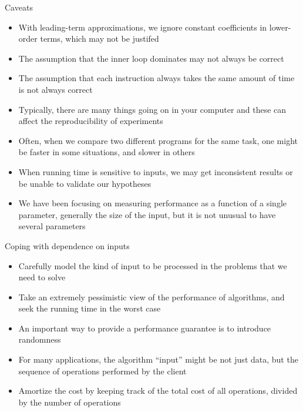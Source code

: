 \documentclass[8pt,a4paper,compress]{beamer}
\begin{document}
\begin{frame}[fragile]
\pause

Caveats
\begin{itemize}
\item With leading-term approximations, we ignore constant coefficients in lower-order terms, which may not be justifed

\item The assumption that the inner loop dominates may not always be correct 

\item The assumption that each instruction always takes the same amount of time is not always correct

\item Typically, there are many things going on in your computer and these can affect the reproducibility of experiments

\item Often, when we compare two different programs for the same task, one might be faster in some situations, and slower in others

\item When running time is sensitive to inputs, we may get inconsistent results or be unable to validate our hypotheses

\item We have been focusing on measuring performance as a function of a single parameter, generally the size of the input, but it is not unusual to have several parameters
\end{itemize}
\end{frame}

\begin{frame}[fragile]
\pause

Coping with dependence on inputs
\begin{itemize}
\item Carefully model the kind of input to be processed in the problems that we need to solve

\item Take an extremely pessimistic view of the performance of algorithms, and seek the running time in the worst case

\item An important way to provide a performance guarantee is to introduce randomness

\item For many applications, the algorithm ``input'' might be not just data, but the sequence of operations performed by the client

\item Amortize the cost by keeping track of the total cost of all operations, divided by the number of operations
\end{itemize}
\end{frame}
\end{document}

